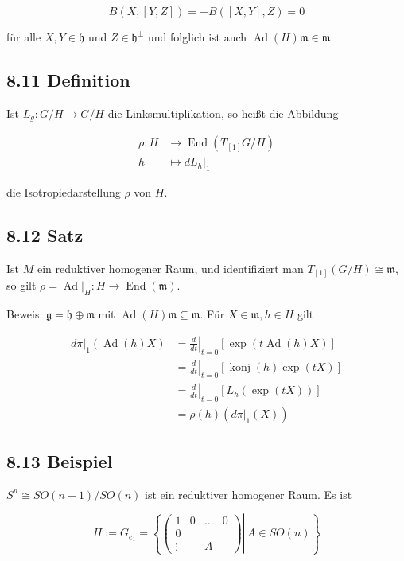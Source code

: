 \documentclass[10pt, letterpaper]{article}
\begin{document}
$$
B(X,[Y, Z])=-B([X, Y], Z)=0
$$

für alle $X, Y \in \mathfrak{h}$ und $Z \in \mathfrak{h}^{\perp}$ und folglich ist auch $\operatorname{Ad}(H) \mathfrak{m} \in \mathfrak{m}$.

\subsection*{8.11 Definition}
Ist $L_{g}: G / H \rightarrow G / H$ die Linksmultiplikation, so heißt die Abbildung

$$
\begin{aligned}
\rho: H & \rightarrow \operatorname{End}\left(T_{[1]} G / H\right) \\
h & \left.\mapsto d L_{h}\right|_{1}
\end{aligned}
$$

die Isotropiedarstellung $\rho$ von $H$.

\subsection*{8.12 Satz}
Ist $M$ ein reduktiver homogener Raum, und identifiziert man $T_{[1]}(G / H) \cong \mathfrak{m}$, so gilt $\rho=\left.\operatorname{Ad}\right|_{H}: H \rightarrow \operatorname{End}(\mathfrak{m})$.

Beweis: $\mathfrak{g}=\mathfrak{h} \oplus \mathfrak{m}$ mit $\operatorname{Ad}(H) \mathfrak{m} \subseteq \mathfrak{m}$. Für $X \in \mathfrak{m}, h \in H$ gilt

$$
\begin{aligned}
\left.d \pi\right|_{1}(\operatorname{Ad}(h) X) & =\left.\frac{d}{d t}\right|_{t=0}[\exp (t \operatorname{Ad}(h) X)] \\
& =\left.\frac{d}{d t}\right|_{t=0}[\operatorname{konj}(h) \exp (t X)] \\
& =\left.\frac{d}{d t}\right|_{t=0}\left[L_{h}(\exp (t X))\right] \\
& =\rho(h)\left(\left.d \pi\right|_{1}(X)\right)
\end{aligned}
$$

\subsection*{8.13 Beispiel}
$S^{n} \cong S O(n+1) / S O(n)$ ist ein reduktiver homogener Raum. Es ist

$$
H:=G_{e_{1}}=\left\{\left.\left(\begin{array}{cccc}
1 & 0 & \ldots & 0 \\
0 & & & \\
\vdots & & A &
\end{array}\right) \right\rvert\, A \in S O(n)\right\}
$$
\end{document}
